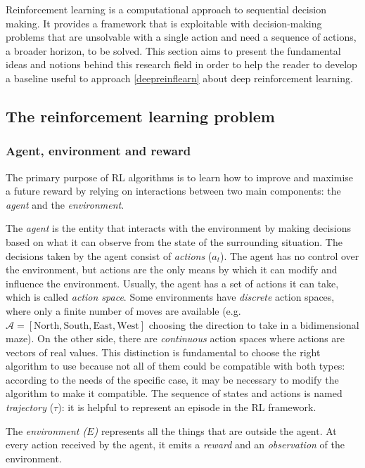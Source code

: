 Reinforcement learning is a computational approach to sequential decision making. It provides a framework that is exploitable with decision-making problems that are unsolvable with a single action and need a sequence of actions, a broader horizon, to be solved.
This section aims to present the fundamental ideas and notions behind this research field in order to help the reader to develop a baseline useful to approach \vref{deepreinflearn} about deep reinforcement learning.

\subsection{The reinforcement learning problem}

\subsubsection{Agent, environment and reward}

The primary purpose of RL algorithms is to learn how to improve and maximise a future reward by relying on interactions between two main components: the \textit{agent} and the \textit{environment}.

The \textit{agent} is the entity that interacts with the environment by making decisions based on what it can observe from the state of the surrounding situation. The decisions taken by the agent consist of \textit{actions} ($a_t$).  The agent has no control over the environment, but actions are the only means by which it can modify and influence the environment.
Usually, the agent has a set of actions it can take, which is called \textit{action space}.
Some environments have \textit{discrete} action spaces, where only a finite number of moves are available (e.g. $\mathcal{A} = [\text{North}, \text{South}, \text{East}, \text{West}]$ choosing the direction to take in a bidimensional maze). On the other side, there are \textit{continuous} action spaces where actions are vectors of real values.
This distinction is fundamental to choose the right algorithm to use because not all of them could be compatible with both types: according to the needs of the specific case, it may be necessary to modify the algorithm to make it compatible. The sequence of states and actions is named \textit{trajectory} ($\tau$): it is helpful to represent an episode in the RL framework.

The \textit{environment ($E$)} represents all the things that are outside the agent. At every action received by the agent, it emits a \textit{reward} and an \textit{observation} of the environment.


